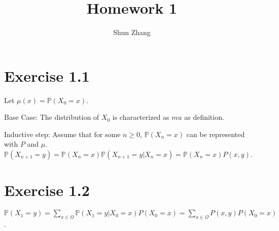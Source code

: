 \documentclass[10pt]{article}
\title{Homework 1}
\author{Shun Zhang}
\date{}
\renewcommand{\P}{\mathbb{P}}
\begin{document}
\maketitle

\section*{Exercise 1.1}

Let $\mu(x) = \P(X_0 = x)$.

Base Case: The distribution of $X_0$ is characterized as $mu$ as definition.

Inductive step: Assume that for some $n \geq 0$, $\P(X_n = x)$ can be
represented with $P$ and $\mu$. $\P(X_{n+1} = y) = \P(X_n = x) \P(X_{n+1} = y |
X_n = x) = \P(X_n = x) P(x, y)$.

\section*{Exercise 1.2}

$\P(X_1 = y) = \sum_{x \in \Omega} \P(X_1 = y | X_0 = x) P(X_0 = x) = \sum_{x
\in \Omega} P(x, y) P(X_0 = x)$.
\end{document}
